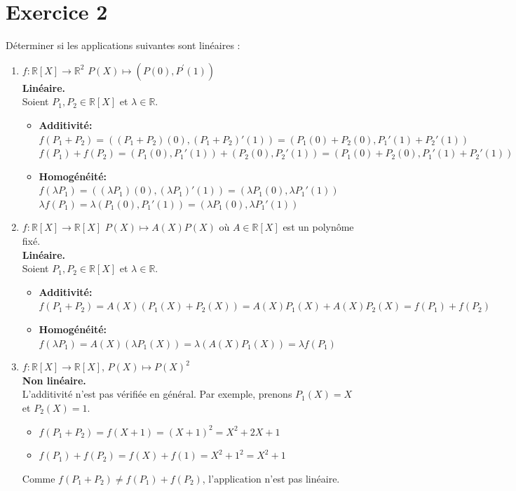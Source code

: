 \documentclass[french]{yLectureNote}
\begin{document}
\section{Exercice 2}
Déterminer si les applications suivantes sont linéaires :
\begin{enumerate}
    \item $f:\mathbb{R}[X]\rightarrow\mathbb{R}^{2}$ $P(X)\mapsto(P(0),P^{\prime}(1))$ \\
    \textbf{Linéaire.} \\
    Soient $P_1, P_2 \in \mathbb{R}[X]$ et $\lambda \in \mathbb{R}$.
    \begin{itemize}
        \item \textbf{Additivité:}
        $f(P_1+P_2) = ((P_1+P_2)(0), (P_1+P_2)'(1)) = (P_1(0)+P_2(0), P_1'(1)+P_2'(1))$
        $f(P_1)+f(P_2) = (P_1(0), P_1'(1)) + (P_2(0), P_2'(1)) = (P_1(0)+P_2(0), P_1'(1)+P_2'(1))$
        \item \textbf{Homogénéité:}
        $f(\lambda P_1) = ((\lambda P_1)(0), (\lambda P_1)'(1)) = (\lambda P_1(0), \lambda P_1'(1))$
        $\lambda f(P_1) = \lambda(P_1(0), P_1'(1)) = (\lambda P_1(0), \lambda P_1'(1))$
    \end{itemize}

    \item $f:\mathbb{R}[X]\rightarrow\mathbb{R}[X]$ $P(X)\mapsto A(X)P(X)$ où $A\in\mathbb{R}[X]$ est un polynôme fixé. \\
    \textbf{Linéaire.} \\
    Soient $P_1, P_2 \in \mathbb{R}[X]$ et $\lambda \in \mathbb{R}$.
    \begin{itemize}
        \item \textbf{Additivité:}
        $f(P_1+P_2) = A(X)(P_1(X)+P_2(X)) = A(X)P_1(X)+A(X)P_2(X) = f(P_1)+f(P_2)$
        \item \textbf{Homogénéité:}
        $f(\lambda P_1) = A(X)(\lambda P_1(X)) = \lambda(A(X)P_1(X)) = \lambda f(P_1)$
    \end{itemize}

    \item $f:\mathbb{R}[X]\rightarrow\mathbb{R}[X]$, $P(X)\mapsto P(X)^{2}$ \\
    \textbf{Non linéaire.} \\
    L'additivité n'est pas vérifiée en général. Par exemple, prenons $P_1(X)=X$ et $P_2(X)=1$.
    \begin{itemize}
        \item $f(P_1+P_2) = f(X+1) = (X+1)^2 = X^2+2X+1$
        \item $f(P_1)+f(P_2) = f(X)+f(1) = X^2+1^2 = X^2+1$
    \end{itemize}
    Comme $f(P_1+P_2) \neq f(P_1)+f(P_2)$, l'application n'est pas linéaire.


\end{enumerate}
\end{document}
